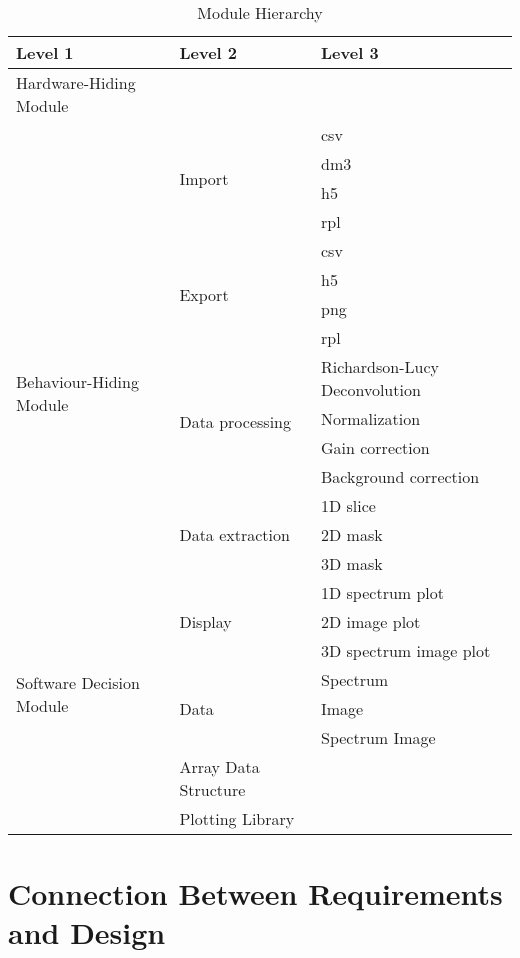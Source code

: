 \documentclass[12pt, titlepage]{article}
\begin{document}
\begin{table}[h!]
\centering
\begin{tabular}{p{} p{} p{}}
\toprule
\textbf{Level 1} & \textbf{Level 2} & \textbf{Level 3}\\
\midrule

{Hardware-Hiding Module} & ~ & ~ \\
\midrule

\multirow{18}{0.25\textwidth}{Behaviour-Hiding Module} &
\multirow{4}{0.25\textwidth}{Import} & csv\\
& & dm3\\
& & h5\\
& & rpl\\\cline{2-3}
& \multirow{4}{0.25\textwidth}{Export} & csv\\
& & h5\\
& & png\\
& & rpl\\\cline{2-3}
& \multirow{4}{0.25\textwidth}{Data processing} & Richardson-Lucy
Deconvolution\\
& & Normalization\\
& & Gain correction\\
& & Background correction\\\cline{2-3}
& \multirow{3}{0.25\textwidth}{Data extraction} & 1D slice\\
& & 2D mask\\
& & 3D mask\\\cline{2-3}
& \multirow{3}{0.25\textwidth}{Display} & 1D spectrum plot\\
& & 2D image plot\\
& & 3D spectrum image plot\\
\midrule

\multirow{2}{0.25\textwidth}{Software Decision Module} &
\multirow{3}{0.25\textwidth}{Data} & Spectrum\\
& & Image\\
& & Spectrum Image\\\cline{2-3}
& Array Data Structure\\\cline{2-3}
& Plotting Library\\

\bottomrule

\end{tabular}
\caption{Module Hierarchy}
\label{TblMH}
\end{table}

\section{Connection Between Requirements and Design} \label{SecConnection}
\end{document}
